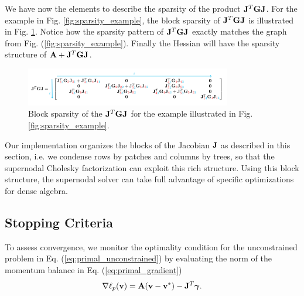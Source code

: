We have now the elements to describe the sparsity of the product
${\mathbf{J}}^T{\mathbf{G}}{\mathbf{J}}$. For the example in Fig. \ref{fig:sparsity_example}, the
block sparsity of ${\mathbf{J}}^T{\mathbf{G}}{\mathbf{J}}$ is illustrated in Fig.
\ref{fig:JTGJ_schematic}. Notice how the sparsity pattern of
${\mathbf{J}}^T{\mathbf{G}}{\mathbf{J}}$ exactly matches the graph from Fig.
(\ref{fig:sparsity_example}). Finally the Hessian will have the sparsity
structure of ${\mathbf{A}} + {\mathbf{J}}^T{\mathbf{G}}{\mathbf{J}}$.
\begin{figure}[!h]
	\centering
	\includegraphics[width=0.8\textwidth]{figures/JTGJ_schematic.png}
	\caption{\label{fig:JTGJ_schematic} 
	Block sparsity of the ${\mathbf{J}}^T{\mathbf{G}}{\mathbf{J}}$ for the example illustrated in
	Fig. \ref{fig:sparsity_example}.}
\end{figure}

Our implementation organizes the blocks of the Jacobian ${\mathbf{J}}$ as described in
this section, i.e. we condense rows by patches and columns by trees, so that the
supernodal Cholesky factorization can exploit this rich structure. Using this
block structure, the supernodal solver can take full advantage of specific
optimizations for dense algebra.



\subsection{Stopping Criteria}
\label{sec:stopping_criteria}

To assess convergence, we monitor the optimality condition for the unconstrained
problem in Eq. (\ref{eq:primal_unconstrained}) by evaluating the norm of the
momentum balance in Eq. (\ref{eq:primal_gradient})
\begin{equation}
	\nabla\ell_p({\mathbf{v}}) = {\mathbf{A}}({\mathbf{v}}-{\mathbf{v}}^*) - {\mathbf{J}}^T{\bm\gamma}.
\end{equation}

